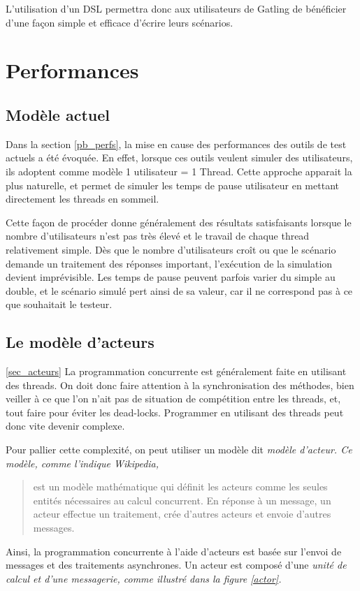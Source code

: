 L'utilisation d'un DSL permettra donc aux utilisateurs de Gatling de bénéficier d'une façon simple et efficace d'écrire leurs scénarios.

\section{Performances}
\subsection{Modèle actuel}
Dans la section \ref{pb_perfs}, la mise en cause des performances des outils de test actuels a été évoquée. En effet, lorsque ces outils veulent simuler des utilisateurs, ils adoptent comme modèle 1 utilisateur = 1 Thread. Cette approche apparait la plus naturelle, et permet de simuler les temps de pause utilisateur en mettant directement les threads en sommeil.

Cette façon de procéder donne généralement des résultats satisfaisants lorsque le nombre d'utilisateurs n'est pas très élevé et le travail de chaque thread relativement simple. Dès que le nombre d'utilisateurs croît ou que le scénario demande un traitement des réponses important, l'exécution de la simulation devient imprévisible. Les temps de pause peuvent parfois varier du simple au double, et le scénario simulé pert ainsi de sa valeur, car il ne correspond pas à ce que souhaitait le testeur. 

\subsection{Le modèle d'acteurs}
\ref{sec_acteurs}
La programmation concurrente est généralement faite en utilisant des threads. On doit donc faire attention à la synchronisation des méthodes, bien veiller à ce que l'on n'ait pas de situation de compétition entre les threads, et, tout faire pour éviter les dead-locks. Programmer en utilisant des threads peut donc vite devenir complexe.

Pour pallier cette complexité, on peut utiliser un modèle dit \em{modèle d'acteur}. Ce modèle, comme l'indique Wikipedia, \begin{quote}est un modèle mathématique qui définit les acteurs comme les seules entités nécessaires au calcul concurrent. En réponse à un message, un acteur effectue un traitement, crée d'autres acteurs et envoie d'autres messages.\end{quote}

Ainsi, la programmation concurrente à l'aide d'acteurs est basée sur l'envoi de messages et des traitements asynchrones. Un acteur est composé d'une \em{unité de calcul} et d'une \em{messagerie}, comme illustré dans la figure \ref{actor}.


